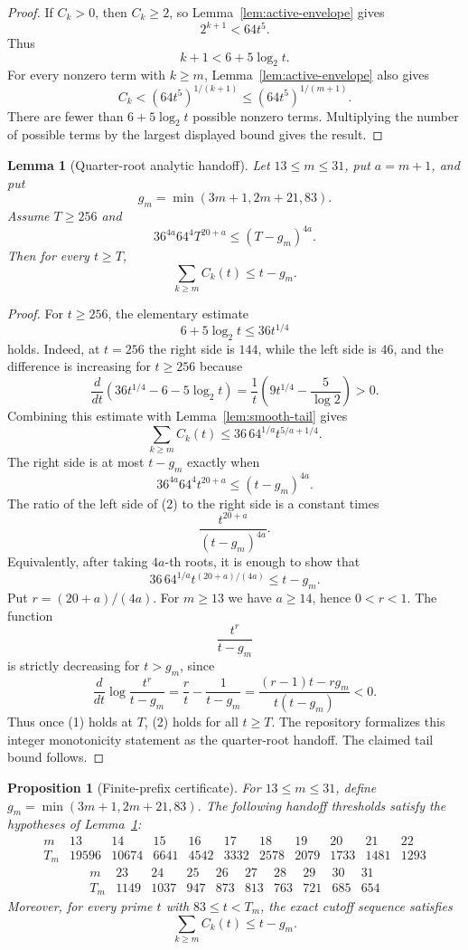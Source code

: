 \documentclass[11pt]{article}
\newtheorem{lemma}{Lemma}
\newtheorem{proposition}{Proposition}
\begin{document}
\begin{proof}
If \(C_k>0\), then \(C_k\ge2\), so Lemma~\ref{lem:active-envelope} gives
\[
  2^{k+1}<64t^5.
\]
Thus
\[
  k+1<6+5\log_2 t.
\]
For every nonzero term with \(k\ge m\), Lemma~\ref{lem:active-envelope} also
gives
\[
  C_k<(64t^5)^{1/(k+1)}
  \le
  (64t^5)^{1/(m+1)}.
\]
There are fewer than \(6+5\log_2 t\) possible nonzero terms.  Multiplying the
number of possible terms by the largest displayed bound gives the result.
\end{proof}

\begin{lemma}[Quarter-root analytic handoff]
\label{lem:handoff}
Let \(13\le m\le31\), put \(a=m+1\), and put
\[
  g_m=\min(3m+1,2m+21,83).
\]
Assume \(T\ge256\) and
\[
  36^{4a}64^4T^{20+a}\le (T-g_m)^{4a}.
  \tag{1}
\]
Then for every \(t\ge T\),
\[
  \sum_{k\ge m}C_k(t)\le t-g_m.
\]
\end{lemma}

\begin{proof}
For \(t\ge256\), the elementary estimate
\[
  6+5\log_2 t\le36t^{1/4}
\]
holds.  Indeed, at \(t=256\) the right side is \(144\), while the left side
is \(46\), and the difference is increasing for \(t\ge256\) because
\[
  \frac{d}{dt}\left(36t^{1/4}-6-5\log_2 t\right)
  =
  \frac{1}{t}\left(9t^{1/4}-\frac{5}{\log 2}\right)>0.
\]
Combining this estimate with Lemma~\ref{lem:smooth-tail} gives
\[
  \sum_{k\ge m}C_k(t)
  \le
  36\,64^{1/a}t^{5/a+1/4}.
\]
The right side is at most \(t-g_m\) exactly when
\[
  36^{4a}64^4t^{20+a}\le (t-g_m)^{4a}.
  \tag{2}
\]
The ratio of the left side of (2) to the right side is a constant times
\[
  \frac{t^{20+a}}{(t-g_m)^{4a}}.
\]
Equivalently, after taking \(4a\)-th roots, it is enough to show that
\[
  36\,64^{1/a}t^{(20+a)/(4a)}\le t-g_m.
\]
Put \(r=(20+a)/(4a)\).  For \(m\ge13\) we have \(a\ge14\), hence \(0<r<1\).
The function
\[
  \frac{t^r}{t-g_m}
\]
is strictly decreasing for \(t>g_m\), since
\[
  \frac{d}{dt}\log \frac{t^r}{t-g_m}
  =
  \frac{r}{t}-\frac{1}{t-g_m}
  =
  \frac{(r-1)t-rg_m}{t(t-g_m)}<0.
\]
Thus once (1) holds at \(T\), (2) holds for all \(t\ge T\).  The repository
formalizes this integer monotonicity statement as the quarter-root handoff.
The claimed tail bound follows.
\end{proof}

\begin{proposition}[Finite-prefix certificate]
\label{prop:finite-certificate}
For \(13\le m\le31\), define \(g_m=\min(3m+1,2m+21,83)\).  The following
handoff thresholds satisfy the hypotheses of Lemma~\ref{lem:handoff}:
\[
\begin{array}{c|cccccccccc}
m&13&14&15&16&17&18&19&20&21&22\\
\hline
T_m&
19596&10674&6641&4542&3332&2578&2079&1733&1481&1293
\end{array}
\]
\[
\begin{array}{c|ccccccccc}
m&23&24&25&26&27&28&29&30&31\\
\hline
T_m&
1149&1037&947&873&813&763&721&685&654
\end{array}
\]
Moreover, for every prime \(t\) with \(83\le t<T_m\), the exact cutoff
sequence satisfies
\[
  \sum_{k\ge m}C_k(t)\le t-g_m.
\]
\end{proposition}
\end{document}
